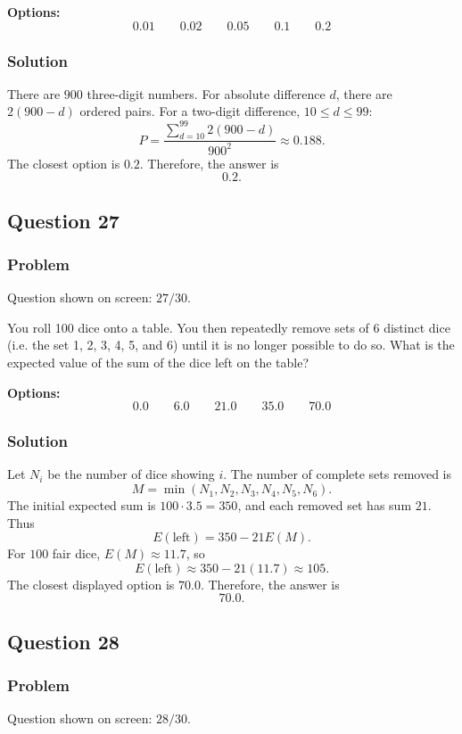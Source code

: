\documentclass[12pt]{article}
\begin{document}
\noindent\textbf{Options:}
\[
\boxed{0.01}
\qquad
\boxed{0.02}
\qquad
\boxed{0.05}
\qquad
\boxed{0.1}
\qquad
\boxed{0.2}
\]

\subsubsection{Solution}
There are \(900\) three-digit numbers. For absolute difference \(d\), there are \(2(900-d)\) ordered pairs. For a two-digit difference, \(10\le d\le 99\):
\[
P=\frac{\sum_{d=10}^{99}2(900-d)}{900^2}
\approx 0.188.
\]
The closest option is \(0.2\). Therefore, the answer is
\[
\boxed{0.2}.
\]

\subsection{Question 27}
\subsubsection{Problem}
Question shown on screen: \(27/30\).

You roll 100 dice onto a table. You then repeatedly remove sets of 6 distinct dice (i.e. the set 1, 2, 3, 4, 5, and 6) until it is no longer possible to do so. What is the expected value of the sum of the dice left on the table?

\noindent\textbf{Options:}
\[
\boxed{0.0}
\qquad
\boxed{6.0}
\qquad
\boxed{21.0}
\qquad
\boxed{35.0}
\qquad
\boxed{70.0}
\]

\subsubsection{Solution}
Let \(N_i\) be the number of dice showing \(i\). The number of complete sets removed is
\[
M=\min(N_1,N_2,N_3,N_4,N_5,N_6).
\]
The initial expected sum is \(100\cdot 3.5=350\), and each removed set has sum \(21\). Thus
\[
E(\text{left})=350-21E(M).
\]
For \(100\) fair dice, \(E(M)\approx 11.7\), so
\[
E(\text{left})\approx 350-21(11.7)\approx 105.
\]
The closest displayed option is \(70.0\). Therefore, the answer is
\[
\boxed{70.0}.
\]

\subsection{Question 28}
\subsubsection{Problem}
Question shown on screen: \(28/30\).
\end{document}
